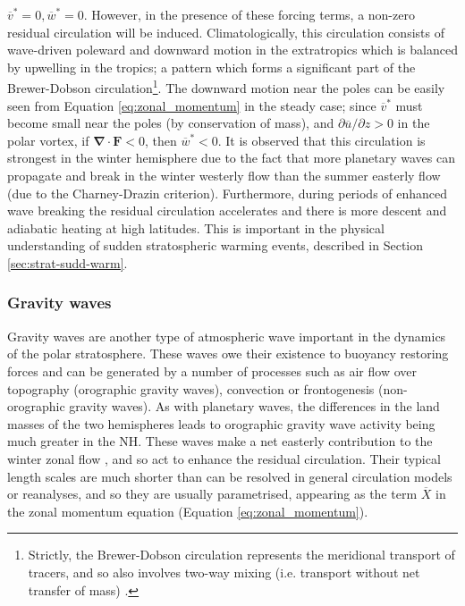 $\overline{v}^*=0, \overline{w}^*=0$.  However, in the presence of these forcing
terms, a non-zero residual circulation will be induced. Climatologically, this
circulation consists of wave-driven poleward and downward motion in the
extratropics which is balanced by upwelling in the tropics; a pattern which
forms a significant part of the Brewer-Dobson circulation\footnote{Strictly, the
  Brewer-Dobson circulation represents the meridional transport of tracers, and
  so also involves two-way mixing (i.e. transport without net transfer of mass)
  \citep{Hall1994}.}. The downward motion near the poles can be easily seen from
Equation \ref{eq:zonal_momentum} in the steady case; since $\overline{v}^*$ must
become small near the poles (by conservation of mass), and
$\partial\overline{u}/\partial z > 0$ in the polar vortex, if
$\mathbf{\nabla\cdot F} < 0$, then $\overline{w}^*<0$. It is observed that this
circulation is strongest in the winter hemisphere due to the fact that more
planetary waves can propagate and break in the winter westerly flow than the
summer easterly flow (due to the Charney-Drazin criterion). Furthermore, during
periods of enhanced wave breaking the residual circulation accelerates and there
is more descent and adiabatic heating at high latitudes. This is important in
the physical understanding of sudden stratospheric warming events, described in
Section \ref{sec:strat-sudd-warm}.


\subsubsection{Gravity waves}

Gravity waves are another type of atmospheric wave important in the dynamics of
the polar stratosphere. These waves owe their existence to buoyancy restoring
forces and can be generated by a number of processes such as air flow over
topography (orographic gravity waves), convection or frontogenesis
(non-orographic gravity waves). As with planetary waves, the differences in the
land masses of the two hemispheres leads to orographic gravity wave activity
being much greater in the NH. These waves make a net easterly contribution to
the winter zonal flow \citep[e.g.,][]{Seviour2012}, and so act to enhance the
residual circulation. Their typical length scales are much shorter than can be
resolved in general circulation models or reanalyses, and so they are usually
parametrised, appearing as the term $\overline{X}$ in the zonal momentum
equation (Equation \ref{eq:zonal_momentum}).

